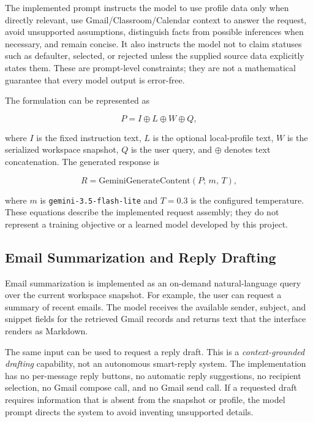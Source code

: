 \documentclass[conference]{IEEEtran}
\begin{document}
The implemented prompt instructs the model to use profile data only when directly relevant, use Gmail/Classroom/Calendar context to answer the request, avoid unsupported assumptions, distinguish facts from possible inferences when necessary, and remain concise. It also instructs the model not to claim statuses such as defaulter, selected, or rejected unless the supplied source data explicitly states them. These are prompt-level constraints; they are not a mathematical guarantee that every model output is error-free.

The formulation can be represented as

\begin{equation}
P = I \oplus L \oplus W \oplus Q,
\end{equation}

where $I$ is the fixed instruction text, $L$ is the optional local-profile text, $W$ is the serialized workspace snapshot, $Q$ is the user query, and $\oplus$ denotes text concatenation. The generated response is

\begin{equation}
R = \text{GeminiGenerateContent}(P;\, m,\, T),
\end{equation}

where $m$ is \texttt{gemini-3.5-flash-lite} and $T=0.3$ is the configured temperature. These equations describe the implemented request assembly; they do not represent a training objective or a learned model developed by this project.

\subsection{Email Summarization and Reply Drafting}

Email summarization is implemented as an on-demand natural-language query over the current workspace snapshot. For example, the user can request a summary of recent emails. The model receives the available sender, subject, and snippet fields for the retrieved Gmail records and returns text that the interface renders as Markdown.

The same input can be used to request a reply draft. This is a \emph{context-grounded drafting} capability, not an autonomous smart-reply system. The implementation has no per-message reply buttons, no automatic reply suggestions, no recipient selection, no Gmail compose call, and no Gmail send call. If a requested draft requires information that is absent from the snapshot or profile, the model prompt directs the system to avoid inventing unsupported details.
\end{document}
